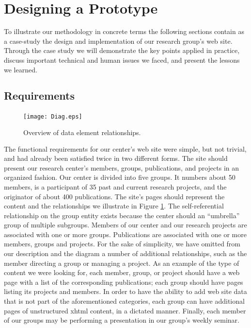 \documentclass[10pt]{article}
\begin{document}
\section{Designing a Prototype}

To illustrate our methodology in concrete terms
the following sections contain as a case-study the design and implementation
of our research group's web site.
Through the case study we will demonstrate the key points applied in
practice, discuss important technical and human issues we faced,
and present the lessons we learned.

\subsection{Requirements}
\label{sec:requirements}

\begin{figure}
\begin{center}
\texttt{[image: Diag.eps]}
\end{center}
\caption{Overview of data element relationships.}
\label{fig:diag}
\end{figure}

The functional requirements for our center's web site were
simple, but not trivial, and had already been satisfied
twice in two different forms.
The site should present our research center's members, groups, publications,
and projects in an organized fashion.
Our center is divided into five groups.
It numbers about 50 members, is a participant of 35 past and current research
projects, and the originator of about 400 publications.
The site's pages should represent the content and the relationships
we illustrate in Figure \ref{fig:diag}.
The self-referential relationship on the group entity exists because the center should  an ``umbrella'' group of multiple subgroups.
Members of our center and our research projects are associated
with one or more groups.
Publications are associated
with one or more members, groups and projects.
For the sake of simplicity,
we have omitted from our description and the diagram
a number of additional relationships,
such as the member directing a group or managing a project.
As an example of the type of content we were looking for, 
each member, group, or project should have a web page with a list
of the corresponding publications;
each group should have pages listing its projects and members. 
In order to have the ability to add web site data that is not part of the aforementioned categories,
each group can have additional pages of unstructured {\sc xhtml} content, in a dictated manner.
Finally, each member of our groups may be performing a presentation in our group's weekly seminar.
\end{document}
